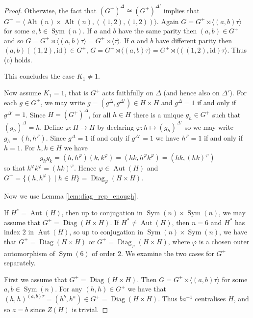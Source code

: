 \documentclass[11pt]{amsart}
\DeclareMathOperator{\Sym}{Sym}
\DeclareMathOperator{\Alt}{Alt}
\DeclareMathOperator{\Aut}{Aut}
\DeclareMathOperator{\Diag}{Diag}
\begin{document}
\begin{proof}
Otherwise,  the fact that $(G^+)^{\Delta}\cong (G^+)^{\Delta'}$ implies that $G^+=\langle\Alt(n)\times \Alt(n),((1,2),(1,2))\rangle.$ 
Again $G=G^+\rtimes \langle(a,b)\tau\rangle$ for some $a,b\in\Sym(n)$. If $a$ and $b$ have the same parity then $(a,b)\in G^+$ and so  $G=G^+\rtimes \langle(a,b)\tau\rangle=G^+\rtimes \langle \tau\rangle$. If $a$ and $b$ have different parity then $(a,b)((1,2),\mathrm{id})\in G^+$, $G=G^+\rtimes \langle(a,b)\tau\rangle=G^+\rtimes \langle ((1,2),\mathrm{id}) \tau\rangle$. Thus (c) holds.

This concludes the case $K_1\neq 1$.

Now assume $K_1=1$, that is $G^+$ acts faithfully on $\Delta$ (and hence also on $\Delta'$). 
    For each $g\in G^+$, we may write $g=(g^\Delta, g^{\Delta'}) \in H \times H$ and $g^{\Delta}=1$ if and only if $g^{\Delta'}=1$. Since $H=(G^+)^{\Delta}$, for all $h\in H$ there is a unique $g_h\in G^+$ such that $(g_h)^{\Delta}=h$. Define $\varphi :H \rightarrow H$ by declaring $\varphi :h \mapsto (g_h)^{\Delta'}$ so we may write $g_h = (h,h^\varphi)$. Since $g^\Delta = 1$ if and only if $g^{\Delta'}=1$ we have $h^\varphi =1$ if and only if $h=1$. For $h,k\in H$ we have
\[
g_h g_k = (h,h^\varphi)(k,k^\varphi) =( hk , h^\varphi k^\varphi) = (hk, (hk)^\varphi)
\]
so that $h^\varphi k^\varphi = (hk)^{\varphi}$. Hence $\varphi \in \Aut(H)$ and $G^+ = \{ (h,h^\varphi) \mid h\in H\}=\Diag_\varphi(H\times H)$.

Now we use Lemma \ref{lem:diag_rep_enough}. %


   If $H^*= \Aut(H)$, then up to conjugation in  $\Sym(n)\times \Sym(n)$, we may assume that $G^+=\Diag(H\times H)$.
  If $H^*\neq \Aut(H)$, then 
$n=6$ and  $H^*$ has index $2$ in $\Aut(H)$, so up to conjugation  in  $\Sym(n)\times \Sym(n)$, we have that  $G^+=\Diag(H\times H)$ or $G^+=\Diag_\varphi(H\times H)$, where $\varphi$ is a chosen outer automorphism of $\Sym(6)$ of order 2. We examine the two cases for $G^+$ separately.

First we assume that  $G^+=\Diag(H\times H)$.
Then $G=G^+\rtimes \langle (a,b)\tau\rangle$ for some $a,b\in \Sym(n)$.
For any $(h,h)\in G^+$ we have that $(h,h)^{(a,b)\tau}=(h^b,h^a)\in G^+=\Diag(H\times H)$. Thus $ba^{-1}$ centralises $H$, and so $a=b$ since $Z(H)$ is trivial.


\end{proof}
\end{document}
